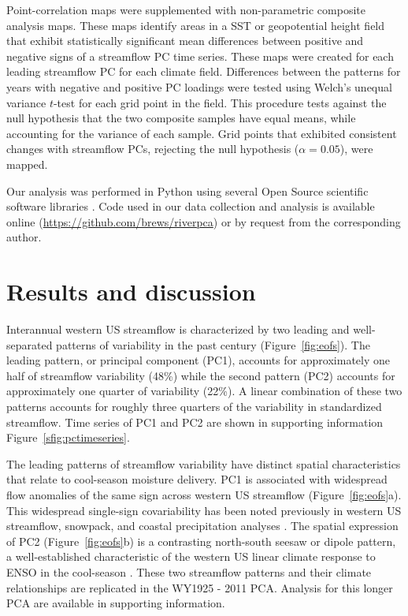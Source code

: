 \documentclass[final, double]{ua-thesis}
\begin{document}
Point-correlation maps were supplemented with non-parametric composite analysis maps. These maps identify areas in a SST or geopotential height field that exhibit statistically significant mean differences between positive and negative signs of a streamflow PC time series. These maps were created for each leading streamflow PC for each climate field. Differences between the patterns for years with negative and positive PC loadings were tested using Welch's unequal variance $t$-test for each grid point in the field. This procedure tests against the null hypothesis that the two composite samples have equal means, while accounting for the variance of each sample. Grid points that exhibited consistent changes with streamflow PCs, rejecting the null hypothesis ($\alpha = 0.05$), were mapped.

Our analysis was performed in Python using several Open Source scientific software libraries \citep{1hunter_matplotlib:_2007, 1van_der_walt_numpy_2011, 1dawson_eofs:_2016}. Code used in our data collection and analysis is available online (\url{https://github.com/brews/riverpca}) or by request from the corresponding author.

\section{Results and discussion}

Interannual western US streamflow is characterized by two leading and well-separated patterns of variability in the past century (Figure~\ref{fig:eofs}). The leading pattern, or principal component (PC1), accounts for approximately one half of streamflow variability (48\%) while the second pattern (PC2) accounts for approximately one quarter of variability (22\%). A linear combination of these two patterns accounts for roughly three quarters of the variability in standardized streamflow. Time series of PC1 and PC2 are shown in supporting information Figure~\ref{sfig:pctimeseries}.%

The leading patterns of streamflow variability have distinct spatial characteristics that relate to cool-season moisture delivery. PC1 is associated with widespread flow anomalies of the same sign across western US streamflow (Figure~\ref{fig:eofs}a). This widespread single-sign covariability has been noted previously in western US streamflow, snowpack, and coastal precipitation analyses \citep{1mcguirk_century_1982, 1cayan_influence_1989, 1lins_regional_1997, 1mccabe_primary_2002}. The spatial expression of PC2 (Figure~\ref{fig:eofs}b) is a contrasting north-south seesaw or dipole pattern, a well-established characteristic of the western US linear climate response to ENSO in the cool-season \citep{1dettinger_northsouth_1998, 1wise_spatiotemporal_2010}. These two streamflow patterns and their climate relationships are replicated in the WY1925 - 2011 PCA. Analysis for this longer PCA are available in supporting information.
\end{document}
